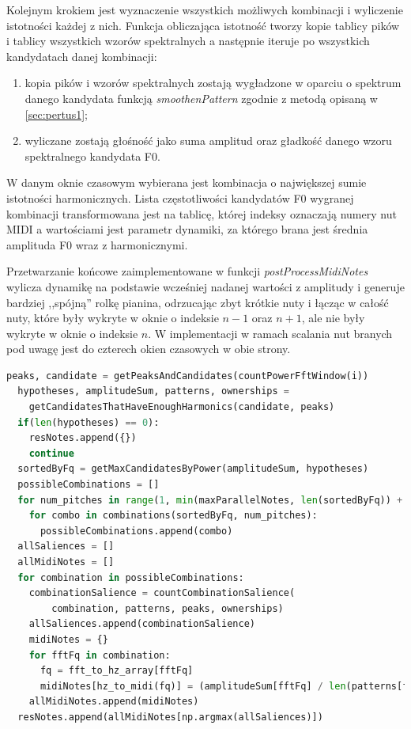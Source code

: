 \documentclass[12pt,a4paper,twoside]{mwart}
\begin{document}
Kolejnym krokiem jest wyznaczenie wszystkich możliwych kombinacji i wyliczenie istotności każdej z nich. Funkcja obliczająca istotność tworzy kopie tablicy pików i tablicy wszystkich wzorów spektralnych a następnie iteruje po wszystkich kandydatach danej kombinacji:
\begin{enumerate}
  \item kopia pików i wzorów spektralnych zostają wygładzone w oparciu o spektrum danego kandydata funkcją \textit{smoothenPattern} zgodnie z metodą opisaną w \ref{sec:pertus1};
  \item wyliczane zostają głośność jako suma amplitud oraz gładkość danego wzoru spektralnego kandydata F0.
\end{enumerate}
W danym oknie czasowym wybierana jest kombinacja o największej sumie istotności harmonicznych. Lista częstotliwości kandydatów F0 wygranej kombinacji transformowana jest na tablicę, której indeksy oznaczają numery nut MIDI a wartościami jest parametr dynamiki, za którego brana jest średnia amplituda F0 wraz z harmonicznymi.

Przetwarzanie końcowe zaimplementowane w funkcji \textit{postProcessMidiNotes} wylicza dynamikę na podstawie wcześniej nadanej wartości z amplitudy i  generuje bardziej ,,spójną'' rolkę pianina, odrzucając zbyt krótkie nuty i łącząc w całość nuty, które były wykryte w oknie o indeksie $n-1$ oraz $n+1$, ale nie były wykryte w oknie o indeksie $n$. W implementacji w ramach scalania nut branych pod uwagę jest do czterech okien czasowych w obie strony.

\begin{lstlisting}[language=Python, caption={Trzon algorytmu Pertusa i Iñesta (2008)}, captionpos=b, label={code:coreMethodPetrusa1}, numbers=none]
  peaks, candidate = getPeaksAndCandidates(countPowerFftWindow(i))
  hypotheses, amplitudeSum, patterns, ownerships =
    getCandidatesThatHaveEnoughHarmonics(candidate, peaks)
  if(len(hypotheses) == 0):
    resNotes.append({})
    continue
  sortedByFq = getMaxCandidatesByPower(amplitudeSum, hypotheses)
  possibleCombinations = []
  for num_pitches in range(1, min(maxParallelNotes, len(sortedByFq)) + 1):
    for combo in combinations(sortedByFq, num_pitches):
      possibleCombinations.append(combo)
  allSaliences = []
  allMidiNotes = []
  for combination in possibleCombinations:
    combinationSalience = countCombinationSalience(
        combination, patterns, peaks, ownerships)
    allSaliences.append(combinationSalience)
    midiNotes = {}
    for fftFq in combination:
      fq = fft_to_hz_array[fftFq]
      midiNotes[hz_to_midi(fq)] = (amplitudeSum[fftFq] / len(patterns[fftFq]))
    allMidiNotes.append(midiNotes)
  resNotes.append(allMidiNotes[np.argmax(allSaliences)])
\end{lstlisting}
\end{document}
